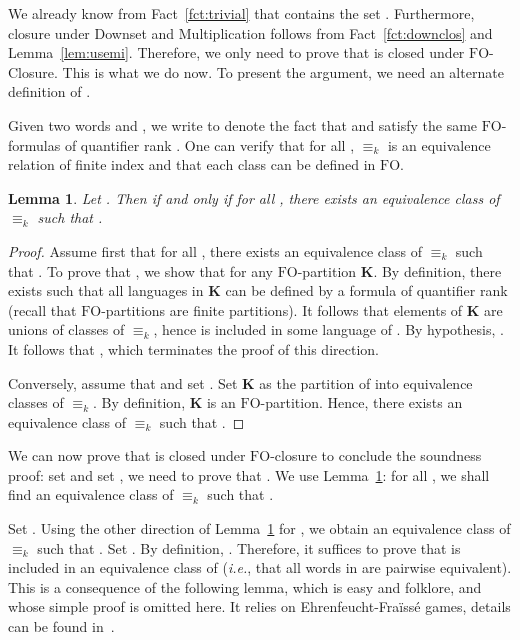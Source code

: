 \documentclass{CSML}
\newcommand\Kb{\ensuremath{\mathbf{K}}\xspace}
\newcommand{\efgame}{Ehrenfeucht-Fra\"iss\'e\xspace}
\newcommand{\fo}{\ensuremath{\text{FO}}\xspace}
\newcommand\foeq[1]{\ensuremath{\equiv_{#1}}\xspace}
\theoremstyle{plain}
\newtheorem{lemma}[thm]{Lemma}
\begin{document}
We already know from Fact~\ref{fct:trivial} that 
contains the set . Furthermore,
closure under Downset and Multiplication follows from
Fact~\ref{fct:downclos} and Lemma~\ref{lem:usemi}. Therefore, we only
need to prove that  is closed under \fo-Closure. This is
what we do now. To present the argument, we need an alternate
definition of .

Given two words  and , we write  to denote the fact that  and  satisfy the same \fo-formulas of
quantifier rank . One can verify that for all , \foeq{k} is an
equivalence relation of finite index and that each class can be
defined in \fo.

\begin{lemma} \label{lem:optequ}
Let . Then  if and
only if for all , there exists an equivalence class 
of \foeq{k} such that .
\end{lemma}

\begin{proof}
  Assume first that for all , there exists an equivalence
  class  of \foeq{k} such that . To prove that
  , we show that  for any
  \fo-partition \Kb. By definition, there exists  such that all
  languages in \Kb can be defined by a formula of quantifier rank  (recall
  that \fo-partitions are finite partitions). It follows that elements of \Kb
  are unions of classes of \foeq{k}, hence  is included in some language 
  of . By hypothesis, . It follows that
  , which terminates the proof of
  this direction.

  Conversely, assume that  and set . Set \Kb as
  the partition of  into equivalence classes of \foeq{k}. By definition,
  \Kb is an \fo-partition. Hence, there exists an equivalence class
   of \foeq{k} such that .
\end{proof}

We can now prove that  is closed under \fo-closure to conclude
the soundness proof: set
 and set , we need to prove that . We use
Lemma~\ref{lem:optequ}: for all , we shall find an equivalence class
 of \foeq{k} such that .

Set . Using the other direction of Lemma~\ref{lem:optequ}
for , we obtain an equivalence class  of \foeq{k} such that . Set .
By definition, . Therefore, it suffices to
prove that  is included in an equivalence class of 
(\emph{i.e.}, that all words in  are pairwise equivalent).
This
is a consequence of the following lemma, which is easy and folklore, and whose
simple proof is omitted here. It relies on \efgame games, details can be
found in~\cite{bookstraub}.
\end{document}
